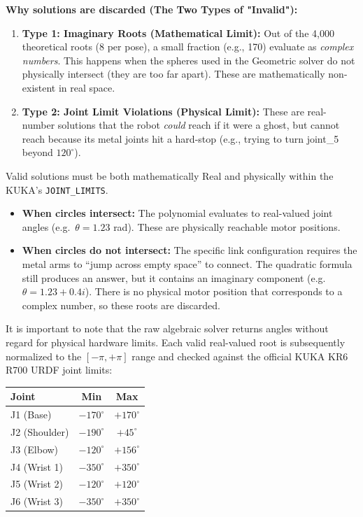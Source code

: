 \documentclass[11pt, a4paper]{article}
\begin{document}
\vspace{0.3cm}
\textbf{Why solutions are discarded (The Two Types of "Invalid"):}
\begin{enumerate}
    \item \textbf{Type 1: Imaginary Roots (Mathematical Limit):} Out of the 4,000 theoretical roots (8 per pose), a small fraction (e.g., 170) evaluate as \textit{complex numbers}. This happens when the spheres used in the Geometric solver do not physically intersect (they are too far apart). These are mathematically non-existent in real space.
    \item \textbf{Type 2: Joint Limit Violations (Physical Limit):} These are real-number solutions that the robot \textit{could} reach if it were a ghost, but cannot reach because its metal joints hit a hard-stop (e.g., trying to turn joint\_5 beyond $120^\circ$).
\end{enumerate}
Valid solutions must be both mathematically Real and physically within the KUKA's \texttt{JOINT\_LIMITS}.

\begin{itemize}
    \item \textbf{When circles intersect:} The polynomial evaluates to real-valued joint angles (e.g.\ $\theta = 1.23$ rad). These are physically reachable motor positions.
    \item \textbf{When circles do not intersect:} The specific link configuration requires the metal arms to ``jump across empty space'' to connect. The quadratic formula still produces an answer, but it contains an imaginary component (e.g.\ $\theta = 1.23 + 0.4i$). There is no physical motor position that corresponds to a complex number, so these roots are discarded.
\end{itemize}

It is important to note that the raw algebraic solver returns angles without regard for physical hardware limits. Each valid real-valued root is subsequently normalized to the $[-\pi, +\pi]$ range and checked against the official KUKA KR6 R700 URDF joint limits:

\begin{center}
\begin{tabular}{l c c}
\textbf{Joint} & \textbf{Min} & \textbf{Max} \\
\hline
J1 (Base)    & $-170^\circ$ & $+170^\circ$ \\
J2 (Shoulder)& $-190^\circ$ & $+45^\circ$ \\
J3 (Elbow)   & $-120^\circ$ & $+156^\circ$ \\
J4 (Wrist 1) & $-350^\circ$ & $+350^\circ$ \\
J5 (Wrist 2) & $-120^\circ$ & $+120^\circ$ \\
J6 (Wrist 3) & $-350^\circ$ & $+350^\circ$ \\
\end{tabular}
\end{center}
\end{document}
